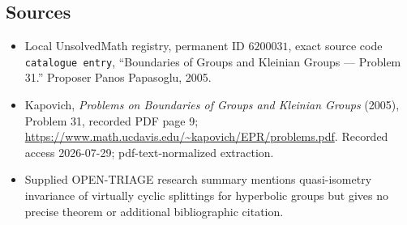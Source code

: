 \documentclass[11pt]{article}
\begin{document}
\subsection{Sources}
\begin{itemize}
\item Local UnsolvedMath registry, permanent ID \(6200031\), exact source code \texttt{catalogue entry}, ``Boundaries of Groups and Kleinian Groups --- Problem 31.'' Proposer Panos Papasoglu, 2005.
\item Kapovich, \emph{Problems on Boundaries of Groups and Kleinian Groups} (2005), Problem 31, recorded PDF page 9; \url{https://www.math.ucdavis.edu/~kapovich/EPR/problems.pdf}. Recorded access 2026-07-29; pdf-text-normalized extraction.
\item Supplied OPEN-TRIAGE research summary mentions quasi-isometry invariance of virtually cyclic splittings for hyperbolic groups but gives no precise theorem or additional bibliographic citation.
\end{itemize}
\end{document}
